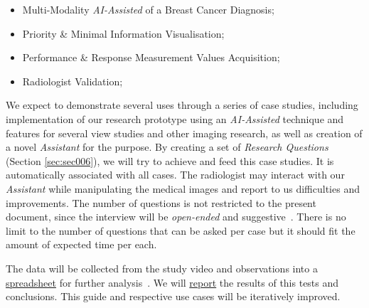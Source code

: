\hfill

\begin{itemize}
\item Multi-Modality \textit{AI-Assisted} of a Breast Cancer Diagnosis;
\item Priority \& Minimal Information Visualisation;
\item Performance \& Response Measurement Values Acquisition;
\item Radiologist Validation;
\end{itemize}

\hfill


We expect to demonstrate several uses through a series of case studies, including implementation of our research prototype using an \textit{AI-Assisted} technique and features for several view studies and other imaging research, as well as creation of a novel \textit{Assistant} for the purpose. By creating a set of {\it Research Questions} (Section \ref{sec:sec006}), we will try to achieve and feed this case studies. It is automatically associated with all cases. The radiologist may interact with our \textit{Assistant} while manipulating the medical images and report to us difficulties and improvements. The number of questions is not restricted to the present document, since the interview will be {\it open-ended} and suggestive~\cite{joyce2017healthcare}. There is no limit to the number of questions that can be asked per case but it should fit the amount of expected time per each.

The data will be collected from the study video and observations into a \hyperlink{https://docs.google.com/spreadsheets/d/1CoPLONnINdBWryGs7SBRuPZA-DnQ0t_yzx3u8ym0UoI/edit?usp=sharing}{spreadsheet} for further analysis~\cite{carayon2015systematic}. We will \hyperlink{https://github.com/mida-project/research-reports}{report} the results of this tests and conclusions. This guide and respective use cases will be iteratively improved.


\clearpage